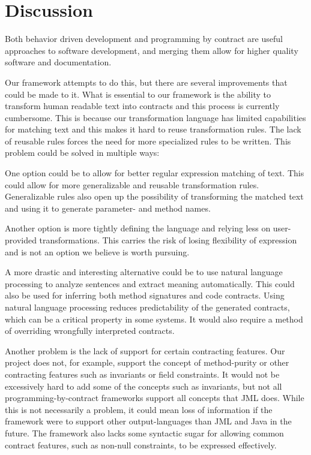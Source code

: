 \section{Discussion}
Both behavior driven development and programming by contract are useful approaches to software development, and merging them allow for higher quality software and documentation.

Our framework attempts to do this, but there are several improvements that could be made to it.
What is essential to our framework is the ability to transform human readable text into contracts and this process is currently cumbersome.
This is because our transformation language has limited capabilities for matching text and this makes it hard to reuse transformation rules.
The lack of reusable rules forces the need for more specialized rules to be written.
This problem could be solved in multiple ways: 

One option could be to allow for better regular expression matching of text.
This could allow for more generalizable and reusable transformation rules.
Generalizable rules also open up the possibility of transforming the matched text and using it to generate parameter- and method names.

Another option is more tightly defining the language and relying less on user-provided transformations.
This carries the risk of losing flexibility of expression and is not an option we believe is worth pursuing.

A more drastic and interesting alternative could be to use natural language processing \cite{jurafsky2002speech} to analyze sentences and extract meaning automatically.
This could also be used for inferring both method signatures and code contracts.
Using natural language processing reduces predictability of the generated contracts, which can be a critical property in some systems.
It would also require a method of overriding wrongfully interpreted contracts.

Another problem is the lack of support for certain contracting features.
Our project does not, for example, support the concept of method-purity or other contracting features such as invariants or field constraints.
It would not be excessively hard to add some of the concepts such as invariants, but not all programming-by-contract frameworks support all concepts that JML does.
While this is not necessarily a problem, it could mean loss of information if the framework were to support other output-languages than JML and Java in the future.
The framework also lacks some syntactic sugar for allowing common contract features, such as non-null constraints, to be expressed effectively.

